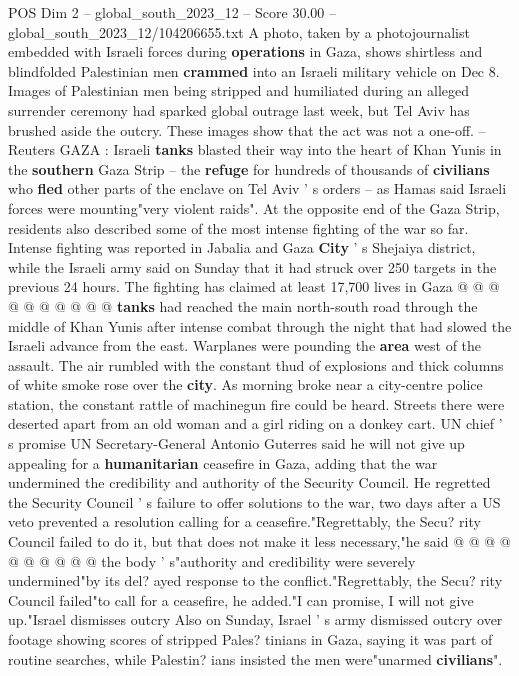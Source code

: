 \begin{textsample}{POS Dim 2 – global\_south\_2023\_12 – Score 30.00 – global\_south\_2023\_12/104206655.txt}  \label{ex:f2_pos_025}
A photo, taken by a photojournalist embedded with Israeli forces during \textbf{operations} in Gaza, shows shirtless and blindfolded Palestinian men \textbf{crammed} into an Israeli military vehicle on Dec 8.
Images of Palestinian men being stripped and humiliated during an alleged surrender ceremony had sparked global outrage last week, but Tel Aviv has brushed aside the outcry.
These images show that the act was not a one-off. -- Reuters GAZA : Israeli \textbf{tanks} blasted their way into the heart of Khan Yunis in the \textbf{southern} Gaza Strip -- the \textbf{refuge} for hundreds of thousands of \textbf{civilians} who \textbf{fled} other parts of the enclave on Tel Aviv ' s orders -- as Hamas said Israeli forces were mounting"very violent raids".
At the opposite end of the Gaza Strip, residents also described some of the most intense fighting of the war so far.
Intense fighting was reported in Jabalia and Gaza \textbf{City} ' s Shejaiya district, while the Israeli army said on Sunday that it had struck over 250 targets in the previous 24 hours.
The fighting has claimed at least 17,700 lives in Gaza @ @ @ @ @ @ @ @ @ @ \textbf{tanks} had reached the main north-south road through the middle of Khan Yunis after intense combat through the night that had slowed the Israeli advance from the east.
Warplanes were pounding the \textbf{area} west of the assault.
The air rumbled with the constant thud of explosions and thick columns of white smoke rose over the \textbf{city}.
As morning broke near a city-centre police station, the constant rattle of machinegun fire could be heard.
Streets there were deserted apart from an old woman and a girl riding on a donkey cart.
UN chief ' s promise UN Secretary-General Antonio Guterres said he will not give up appealing for a \textbf{humanitarian} ceasefire in Gaza, adding that the war undermined the credibility and authority of the Security Council.
He regretted the Security Council ' s failure to offer solutions to the war, two days after a US veto prevented a resolution calling for a ceasefire."Regrettably, the Secu? rity Council failed to do it, but that does not make it less necessary,"he said @ @ @ @ @ @ @ @ @ @ the body ' s"authority and credibility were severely undermined"by its del? ayed response to the conflict."Regrettably, the Secu? rity Council failed"to call for a ceasefire, he added."I can promise, I will not give up."Israel dismisses outcry Also on Sunday, Israel ' s army dismissed outcry over footage showing scores of stripped Pales? tinians in Gaza, saying it was part of routine searches, while Palestin? ians insisted the men were"unarmed \textbf{civilians}".

\end{textsample}
